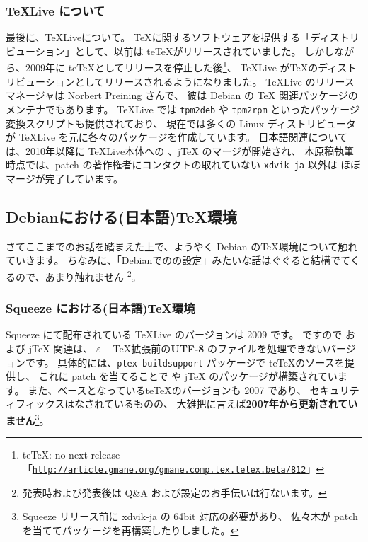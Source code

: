 \documentclass[mingoth,a4paper]{jsarticle}
\begin{document}
\subsubsection{{\TeX}Live について}

最後に、{\TeX}Liveについて。
{\TeX}に関するソフトウェアを提供する「ディストリビューション」として、以前は te\TeX がリリースされていました。
しかしながら、2009年に te\TeX としてリリースを停止した後\footnote{%
   teTeX: no next release
   「{\tt{\url{http://article.gmane.org/gmane.comp.tex.tetex.beta/812}}}」
}、
{\TeX}Live が{\TeX}のディストリビューションとしてリリースされるようになりました。
%
{\TeX}Live のリリースマネージャは Norbert Preining さんで、
彼は Debian の {\TeX} 関連パッケージのメンテナでもあります。
{\TeX}Live では {\tt{tpm2deb}} や {\tt{tpm2rpm}} といったパッケージ変換スクリプトも提供されており、
現在では多くの Linux ディストリビュータが {\TeX}Live を元に各々のパッケージを作成しています。
%
日本語関連については、2010年以降に {\TeX}Live本体への \pTeX、j{\TeX} のマージが開始され、
本原稿執筆時点では、patch の著作権者にコンタクトの取れていない {\tt{xdvik-ja}} 以外は
ほぼマージが完了しています。

\subsection{Debianにおける(日本語){\TeX}環境}

さてここまでのお話を踏まえた上で、ようやく Debian の{\TeX}環境について触れていきます。
%
ちなみに、「Debianでの{\pLaTeX}の設定」みたいな話はぐぐると結構でてくるので、あまり触れません
\footnote{%
  発表時および発表後は Q\&A および設定のお手伝いは行ないます。
}。

\subsubsection{Squeeze における(日本語){\TeX}環境}

Squeeze にて配布されている {\TeX}Live のバージョンは 2009 です。
ですので \pTeX および j{\TeX} 関連は、
$\varepsilon-$\TeX 拡張前の{\bf{UTF-8}}
のファイルを処理できないバージョンです。
具体的には、{\tt{ptex-buildsupport}} パッケージで te{\TeX}のソースを提供し、
これに patch を当てることで \pTeX や j{\TeX} のパッケージが構築されています。
%
また、ベースとなっているte{\TeX}のバージョンも 2007 であり、
セキュリティフィックスはなされているものの、
大雑把に言えば{\bf{2007年から更新されていません}}\footnote{%
  Squeeze リリース前に xdvik-ja の 64bit 対応の必要があり、
  佐々木が patch を当ててパッケージを再構築したりしました。
}。
\end{document}
